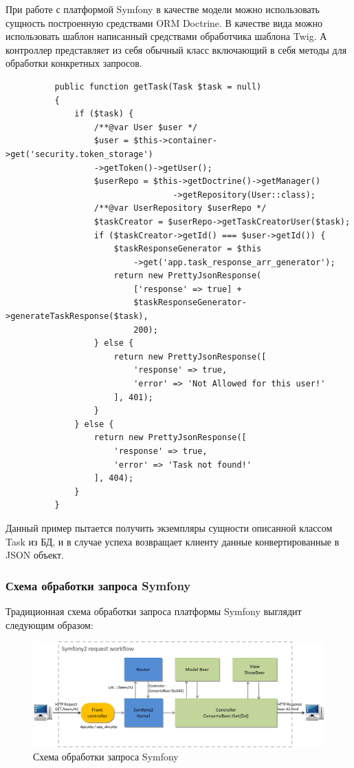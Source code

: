 При работе с платформой Symfony в качестве модели можно использовать сущность построенную средствами ORM Doctrine. В качестве вида можно использовать шаблон написанный средствами обработчика шаблона Twig. А контроллер представляет из себя обычный класс включающий в себя методы для обработки конкретных запросов.

\begin{lstlisting}
          public function getTask(Task $task = null)
          {
              if ($task) {
                  /**@var User $user */
                  $user = $this->container->get('security.token_storage')
                  ->getToken()->getUser();
                  $userRepo = $this->getDoctrine()->getManager()
                                  ->getRepository(User::class);
                  /**@var UserRepository $userRepo */
                  $taskCreator = $userRepo->getTaskCreatorUser($task);
                  if ($taskCreator->getId() === $user->getId()) {
                      $taskResponseGenerator = $this
                          ->get('app.task_response_arr_generator');
                      return new PrettyJsonResponse(
                          ['response' => true] + 
                          $taskResponseGenerator->generateTaskResponse($task),
                          200);
                  } else {
                      return new PrettyJsonResponse([
                          'response' => true,
                          'error' => 'Not Allowed for this user!'
                      ], 401);
                  }
              } else {
                  return new PrettyJsonResponse([
                      'response' => true,
                      'error' => 'Task not found!'
                  ], 404);
              }
          }
\end{lstlisting}
Данный пример пытается получить экземпляры сущности описанной классом Task из БД, и в случае успеха возвращает клиенту данные конвертированные в JSON объект. 

\subsubsection{Схема обработки запроса Symfony }
Традиционная схема обработки запроса платформы Symfony выглядит следующим образом:
\begin{figure}[ht]
\centering
  \includegraphics[scale=0.35]{images/request-workflow.png}  
  \caption{  Схема обработки запроса Symfony }
  \label{fig:domain:symfony_request_workflow}
\end{figure}

